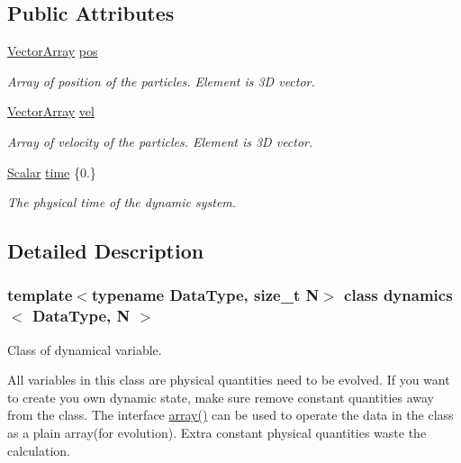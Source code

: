 \subsection*{Public Attributes}
\begin{DoxyCompactItemize}
\item 
\mbox{\hyperlink{classdynamics_a41e25703d6668a66d96a1db3dc5df03b}{Vector\+Array}} \mbox{\hyperlink{classdynamics_a79f983dcbf7107058280f798ab419b69}{pos}}
\begin{DoxyCompactList}\small\item\em Array of position of the particles. Element is 3D vector. \end{DoxyCompactList}\item 
\mbox{\hyperlink{classdynamics_a41e25703d6668a66d96a1db3dc5df03b}{Vector\+Array}} \mbox{\hyperlink{classdynamics_a211067eb96b01c17d2fc73d1fc65d595}{vel}}
\begin{DoxyCompactList}\small\item\em Array of velocity of the particles. Element is 3D vector. \end{DoxyCompactList}\item 
\mbox{\hyperlink{classdynamics_a444c7534e86115117798563cb0e43cde}{Scalar}} \mbox{\hyperlink{classdynamics_a95cb1723922c4224bf5d1118eed46c0c}{time}} \{0.\}
\begin{DoxyCompactList}\small\item\em The physical time of the dynamic system. \end{DoxyCompactList}\end{DoxyCompactItemize}


\subsection{Detailed Description}
\subsubsection*{template$<$typename Data\+Type, size\+\_\+t N$>$\newline
class dynamics$<$ Data\+Type, N $>$}

Class of dynamical variable. 

All variables in this class are physical quantities need to be evolved. If you want to create you own dynamic state, make sure remove constant quantities away from the class. The interface \mbox{\hyperlink{classdynamics_add2d27f86c6f415999e9e7dd05cc8025}{array()}} can be used to operate the data in the class as a plain array(for evolution). Extra constant physical quantities waste the calculation. 

